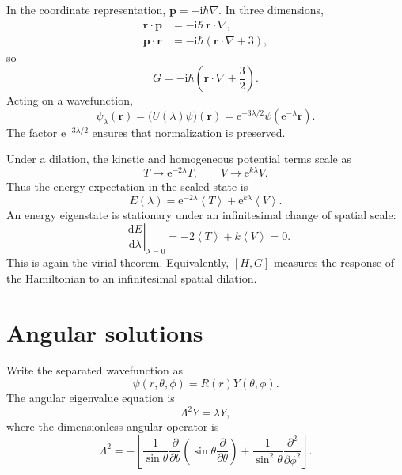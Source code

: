 \documentclass[11pt]{article}
\newcommand{\dd}{\mathop{}\!\mathrm{d}}
\newcommand{\ee}{\mathrm{e}}
\newcommand{\ii}{\mathrm{i}}
\newcommand{\avg}[1]{\left\langle #1\right\rangle}
\newcommand{\comm}[2]{\left[#1,#2\right]}
\newcommand{\vect}[1]{\bm{#1}}
\begin{document}
In the coordinate representation, $\vect{p}=-\ii\hbar\nabla$.  In three
dimensions,
\begin{align}
  \vect{r}\cdot\vect{p}&=-\ii\hbar\,\vect{r}\cdot\nabla,\\
  \vect{p}\cdot\vect{r}&=-\ii\hbar\left(\vect{r}\cdot\nabla+3\right),
\end{align}
so
\begin{equation}
  \boxed{G=-\ii\hbar\left(\vect{r}\cdot\nabla+\frac{3}{2}\right)}.
\end{equation}
Acting on a wavefunction,
\begin{equation}
  \boxed{
  \psi_{\lambda}(\vect{r})
  =\bigl(U(\lambda)\psi\bigr)(\vect{r})
  =\ee^{-3\lambda/2}\psi\left(\ee^{-\lambda}\vect{r}\right)
  }.
\end{equation}
The factor $\ee^{-3\lambda/2}$ ensures that normalization is preserved.

Under a dilation, the kinetic and homogeneous potential terms scale as
\begin{equation}
  T\longrightarrow \ee^{-2\lambda}T,
  \qquad
  V\longrightarrow \ee^{k\lambda}V.
\end{equation}
Thus the energy expectation in the scaled state is
\begin{equation}
  E(\lambda)
  =\ee^{-2\lambda}\avg{T}
  +\ee^{k\lambda}\avg{V}.
\end{equation}
An energy eigenstate is stationary under an infinitesimal change of spatial
scale:
\begin{equation}
  \left.\frac{\dd E}{\dd\lambda}\right|_{\lambda=0}
  =-2\avg{T}+k\avg{V}=0.
\end{equation}
This is again the virial theorem.  Equivalently, $\comm{H}{G}$ measures the
response of the Hamiltonian to an infinitesimal spatial dilation.

\section{Angular solutions}

Write the separated wavefunction as
\begin{equation}
  \psi(r,\theta,\phi)=R(r)Y(\theta,\phi).
\end{equation}
The angular eigenvalue equation is
\begin{equation}
  \Lambda^2Y=\lambda Y,
\end{equation}
where the dimensionless angular operator is
\begin{equation}
  \boxed{
  \Lambda^2=-\left[
  \frac{1}{\sin\theta}\frac{\partial}{\partial\theta}
  \left(\sin\theta\frac{\partial}{\partial\theta}\right)
  +\frac{1}{\sin^2\theta}\frac{\partial^2}{\partial\phi^2}
  \right]
  }.
\end{equation}
\end{document}

